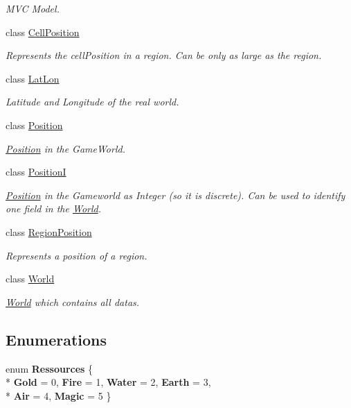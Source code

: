 \begin{DoxyCompactItemize}
\begin{DoxyCompactList}\small\item\em M\-V\-C Model. \end{DoxyCompactList}\item 
class \hyperlink{classCore_1_1Models_1_1CellPosition}{Cell\-Position}
\begin{DoxyCompactList}\small\item\em Represents the cell\-Position in a region. Can be only as large as the region. \end{DoxyCompactList}\item 
class \hyperlink{classCore_1_1Models_1_1LatLon}{Lat\-Lon}
\begin{DoxyCompactList}\small\item\em Latitude and Longitude of the real world. \end{DoxyCompactList}\item 
class \hyperlink{classCore_1_1Models_1_1Position}{Position}
\begin{DoxyCompactList}\small\item\em \hyperlink{classCore_1_1Models_1_1Position}{Position} in the Game\-World. \end{DoxyCompactList}\item 
class \hyperlink{classCore_1_1Models_1_1PositionI}{Position\-I}
\begin{DoxyCompactList}\small\item\em \hyperlink{classCore_1_1Models_1_1Position}{Position} in the Gameworld as Integer (so it is discrete). Can be used to identify one field in the \hyperlink{classCore_1_1Models_1_1World}{World}. \end{DoxyCompactList}\item 
class \hyperlink{classCore_1_1Models_1_1RegionPosition}{Region\-Position}
\begin{DoxyCompactList}\small\item\em Represents a position of a region. \end{DoxyCompactList}\item 
class \hyperlink{classCore_1_1Models_1_1World}{World}
\begin{DoxyCompactList}\small\item\em \hyperlink{classCore_1_1Models_1_1World}{World} which contains all datas. \end{DoxyCompactList}\end{DoxyCompactItemize}
\subsection*{Enumerations}
\begin{DoxyCompactItemize}
\item 
enum {\bfseries Ressources} \{ \\*
{\bfseries Gold} = 0, 
{\bfseries Fire} = 1, 
{\bfseries Water} = 2, 
{\bfseries Earth} = 3, 
\\*
{\bfseries Air} = 4, 
{\bfseries Magic} = 5
 \}
\end{DoxyCompactItemize}
